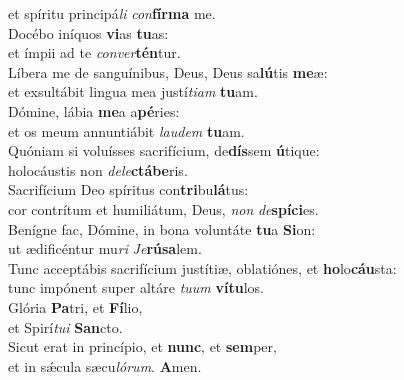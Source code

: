 \oddverse et spíritu principá\textit{li} \textit{con}\textbf{fír}\textbf{ma} me.\\
\evenverse Docébo iníquos \textbf{vi}as \textbf{tu}as:~\*\\
\evenverse et ímpii ad te \textit{con}\textit{ver}\textbf{tén}tur.\\
\oddverse Líbera me de sanguínibus, Deus, Deus sa\textbf{lú}tis \textbf{me}æ:~\*\\
\oddverse et exsultábit lingua mea justí\textit{ti}\textit{am} \textbf{tu}am.\\
\evenverse Dómine, lábia \textbf{me}a a\textbf{pé}ries:~\*\\
\evenverse et os meum annuntiábit \textit{lau}\textit{dem} \textbf{tu}am.\\
\oddverse Quóniam si voluísses sacrifícium, de\textbf{dís}sem \textbf{ú}tique:~\*\\
\oddverse holocáustis non \textit{de}\textit{le}\textbf{ctá}\textbf{be}ris.\\
\evenverse Sacrifícium Deo spíritus con\textbf{tri}bu\textbf{lá}tus:~\*\\
\evenverse cor contrítum et humiliátum, Deus, \textit{non} \textit{de}\textbf{spí}\textbf{ci}es.\\
\oddverse Benígne fac, Dómine, in bona voluntáte \textbf{tu}a \textbf{Si}on:~\*\\
\oddverse ut ædificéntur mu\textit{ri} \textit{Je}\textbf{rú}\textbf{sa}lem.\\
\evenverse Tunc acceptábis sacrifícium justítiæ, oblatiónes, et \textbf{ho}lo\textbf{cáu}sta:~\*\\
\evenverse tunc impónent super altáre \textit{tu}\textit{um} \textbf{ví}\textbf{tu}los.\\
\oddverse Glória \textbf{Pa}tri, et \textbf{Fí}lio,~\*\\
\oddverse et Spirí\textit{tu}\textit{i} \textbf{San}cto.\\
\evenverse Sicut erat in princípio, et \textbf{nunc}, et \textbf{sem}per,~\*\\
\evenverse et in sǽcula sæcu\textit{ló}\textit{rum}. \textbf{A}men.\\
